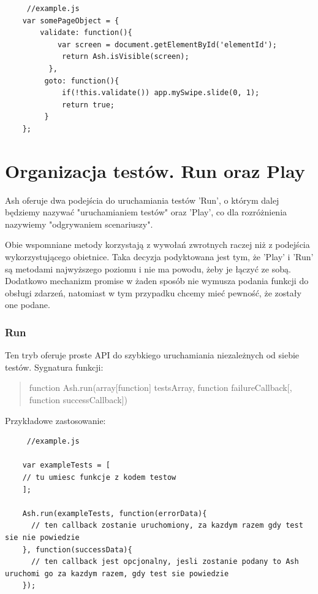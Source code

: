 \documentclass[brudnopis]{xmgr}
\begin{document}
\begin{lstlisting}
     //example.js
    var somePageObject = {
    	validate: function(){
      	    var screen = document.getElementById('elementId');
             return Ash.isVisible(screen);
          },
         goto: function(){
             if(!this.validate()) app.mySwipe.slide(0, 1);
             return true;
         }
    };
\end{lstlisting}

\section{Organizacja testów. Run oraz Play}

Ash oferuje dwa podejścia do uruchamiania testów 'Run', o którym dalej będziemy nazywać "uruchamianiem testów" oraz 'Play', co dla rozróżnienia nazywiemy "odgrywaniem scenariuszy".

Obie wspomniane metody korzystają z wywołań zwrotnych raczej niż z podejścia wykorzystującego obietnice. Taka decyzja podyktowana jest tym, że 'Play' i 'Run' są  metodami najwyższego poziomu i nie ma powodu, żeby je łączyć ze sobą. Dodatkowo mechanizm promise w żaden sposób nie wymusza podania funkcji do obsługi zdarzeń, natomiast w tym przypadku chcemy mieć pewność, że zostały one podane.  

\subsubsection{Run}

Ten tryb oferuje proste API do szybkiego uruchamiania niezależnych od siebie testów. Sygnatura funkcji: 

\begin{quote}
function Ash.run(array[function] testsArray, function failureCallback[, function successCallback]) 
\end{quote}

Przykładowe zastosowanie: 

\begin{lstlisting}
     //example.js

    var exampleTests = [
	// tu umiesc funkcje z kodem testow
    ];

    Ash.run(exampleTests, function(errorData){
      // ten callback zostanie uruchomiony, za kazdym razem gdy test sie nie powiedzie
    }, function(successData){
      // ten callback jest opcjonalny, jesli zostanie podany to Ash uruchomi go za kazdym razem, gdy test sie powiedzie
    });
\end{lstlisting}
\end{document}

